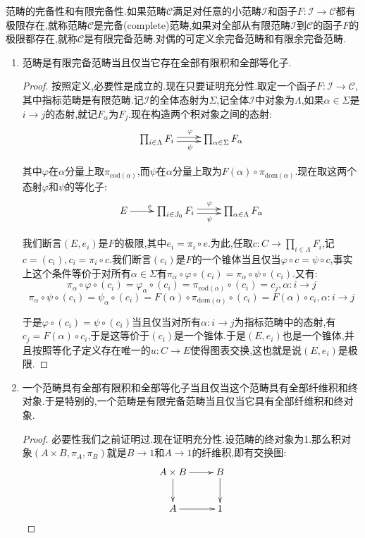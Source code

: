 范畴的完备性和有限完备性.如果范畴$\mathscr{C}$满足对任意的小范畴$\mathscr{I}$和函子$F:\mathscr{I}\to\mathscr{C}$都有极限存在,就称范畴$\mathscr{C}$是完备(complete)范畴,如果对全部从有限范畴$\mathscr{I}$到$\mathscr{C}$的函子$F$的极限都存在,就称$\mathscr{C}$是有限完备范畴.对偶的可定义余完备范畴和有限余完备范畴.
\begin{enumerate}
	\item 范畴是有限完备范畴当且仅当它存在全部有限积和全部等化子.
	\begin{proof}
		
		按照定义,必要性是成立的.现在只要证明充分性.取定一个函子$F:\mathscr{I}\to\mathscr{C}$,其中指标范畴是有限范畴.记$\mathscr{I}$的全体态射为$\Sigma$,记全体$\mathscr{I}$中对象为$\Lambda$,如果$\alpha\in\Sigma$是$i\to j$的态射,就记$F_{\alpha}$为$F_j$.现在构造两个积对象之间的态射:
		$$\xymatrix{\prod_{i\in \Lambda}F_i\ar@<0.5ex>[r]^{\varphi}\ar@<-0.5ex>[r]_{\psi}&\prod_{\alpha\in\Sigma}F_{\alpha}}$$
		
		其中$\varphi$在$\alpha$分量上取$\pi_{\mathrm{cod}(\alpha)}$,而$\psi$在$\alpha$分量上取为$F(\alpha)\circ\pi_{\mathrm{dom}(\alpha)}$.现在取这两个态射$\varphi$和$\psi$的等化子:
		$$\xymatrix{E\ar[r]^e&\prod_{i\in J_0}F_i\ar@<0.5ex>[r]^{\varphi}\ar@<-0.5ex>[r]_{\psi}&\prod_{\alpha\in\Lambda}F_{\alpha}}$$
		
		我们断言$(E,e_i)$是$F$的极限,其中$e_i=\pi_i\circ e$.为此,任取$c:C\to\prod_{i\in \Lambda}F_i$,记$c=(c_i),c_i=\pi_i\circ c$.我们断言$(c_i)$是$F$的一个锥体当且仅当$\varphi\circ c=\psi\circ c$,事实上这个条件等价于对所有$\alpha\in\Sigma$有$\pi_{\alpha}\circ\varphi\circ(c_i)=\pi_{\alpha}\circ\psi\circ(c_i)$.又有:
		$$\pi_{\alpha}\circ\varphi\circ(c_i)=\varphi_{\alpha}\circ(c_i)=\pi_{\mathrm{cod}(\alpha)}\circ(c_i)=c_j,\alpha:i\to j$$
		$$\pi_{\alpha}\circ\psi\circ(c_i)=\psi_{\alpha}\circ(c_i)=F(\alpha)\circ\pi_{\mathrm{dom}(\alpha)}\circ(c_i)=F(\alpha)\circ c_i,\alpha:i\to j$$
		
		于是$\varphi\circ(c_i)=\psi\circ(c_i)$当且仅当对所有$\alpha:i\to j$为指标范畴中的态射,有$c_j=F(\alpha)\circ c_i$,于是这等价于$(c_i)$是一个锥体.于是$(E,e_i)$也是一个锥体,并且按照等化子定义存在唯一的$u:C\to E$使得图表交换,这也就是说$(E,e_i)$是极限.
	\end{proof}	
    \item 一个范畴具有全部有限积和全部等化子当且仅当这个范畴具有全部纤维积和终对象.于是特别的,一个范畴是有限完备范畴当且仅当它具有全部纤维积和终对象.
    \begin{proof}
    	
    	必要性我们之前证明过.现在证明充分性.设范畴的终对象为1.那么积对象$(A\times B,\pi_A,\pi_B)$就是$B\to1$和$A\to1$的纤维积,即有交换图:
    	$$\xymatrix{A\times B\ar[d]\ar[r]&B\ar[d]\\ A\ar[r]&1}$$
    	

\end{proof}
\end{enumerate}
